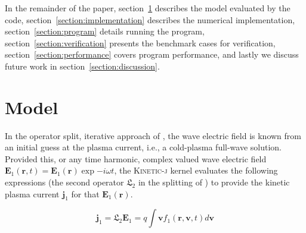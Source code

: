 \documentclass[final,5p,times,twocolumn]{elsarticle}
\renewcommand{\vec}[1]{\mathbf{#1}}
\newcommand{\kj}{\textsc{Kinetic-j}\xspace}
\newcommand{\jp}{\ensuremath{\vec{j}_{\mathrm{1}}}\xspace}
\begin{document}
In the remainder of the paper, section~\ref{section:model} describes the model evaluated by the code, section~\ref{section:implementation} describes the numerical implementation, section~\ref{section:program} details running the program, section~\ref{section:verification} presents the benchmark cases for verification, section~\ref{section:performance} covers program performance, and lastly we discuss future work in section~\ref{section:discussion}.
%
\section{Model}
\label{section:model}
%
In the operator split, iterative approach of \cite{green2014}, the wave electric field is known from an initial guess at the plasma current, i.e., a cold-plasma full-wave solution. Provided this, or any time harmonic, complex valued wave electric field $\vec{E}_{\mathrm{1}}\left(\vec{r},t\right)=\vec{E}_{\mathrm{1}}\left(\vec{r}\right)\exp{-i\omega t}$, the \kj kernel evaluates the following expressions (the second operator $\mathfrak{L}_{\mathrm{2}}$ in the splitting of \cite{green2014}) to provide the kinetic plasma current \jp for that $\vec{E}_{\mathrm{1}}\left(\vec{r}\right)$.

\begin{linenomath}
\begin{equation}
\jp=\mathfrak{L}_{\mathrm{2}}\vec{E}_{\mathrm{1}}=q\int \vec{v}f_{\mathrm{1}}\left(\vec{r},\vec{v},t\right)d\vec{v}
\label{eq:j1}
\end{equation}
\end{linenomath}
\end{document}

